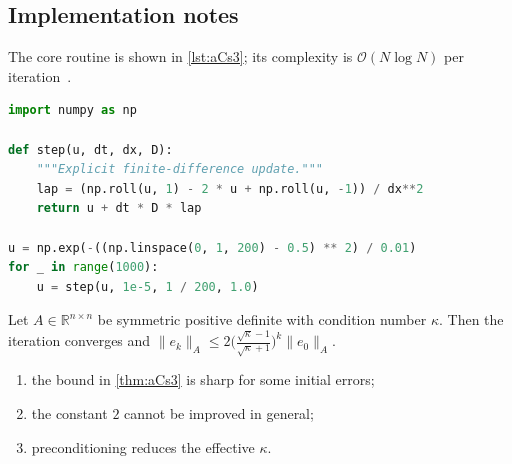 \subsection{Implementation notes}\label{sec:aCs3-i}
The core routine is shown in \cref{lst:aCs3}; its complexity is $\mathcal{O}(N\log N)$ per iteration~\cite{appx-4}.

\begin{lstlisting}[language=python,caption={Reference implementation for aCs3.},label={lst:aCs3}]
import numpy as np

def step(u, dt, dx, D):
    """Explicit finite-difference update."""
    lap = (np.roll(u, 1) - 2 * u + np.roll(u, -1)) / dx**2
    return u + dt * D * lap

u = np.exp(-((np.linspace(0, 1, 200) - 0.5) ** 2) / 0.01)
for _ in range(1000):
    u = step(u, 1e-5, 1 / 200, 1.0)
\end{lstlisting}

\lipsum[92-92]
\begin{theorem}\label{thm:aCs3}
Let $A\in\mathbb{R}^{n\times n}$ be symmetric positive definite with condition number $\kappa$. Then the iteration converges and
$\lVert e_k\rVert_A \le 2\bigl(\tfrac{\sqrt\kappa-1}{\sqrt\kappa+1}\bigr)^k\lVert e_0\rVert_A$.
\end{theorem}
\begin{enumerate}[label=(\roman*)]
\item the bound in \cref{thm:aCs3} is sharp for some initial errors;
\item the constant $2$ cannot be improved in general;
\item preconditioning reduces the effective $\kappa$.
\end{enumerate}

\lipsum[16-16]
